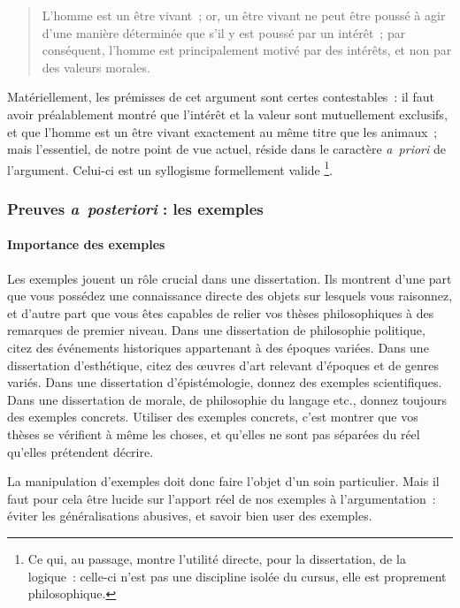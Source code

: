 \documentclass[a4paper]{article}
\begin{document}
\begin{quote}
L'homme est un être vivant ; or, un être vivant ne peut être poussé à
agir d'une manière déterminée que s'il y est poussé par un intérêt ;
par conséquent, l'homme est principalement motivé par des intérêts, et
non par des valeurs morales.
\end{quote}

Matériellement, les prémisses de cet argument sont certes contestables :
il faut avoir préalablement montré que l'intérêt et la valeur sont
mutuellement exclusifs, et que l'homme est un être vivant exactement au
même titre que les animaux ; mais l'essentiel, de notre point de vue
actuel, réside dans le caractère \emph{a priori} de l'argument. Celui-ci est
un syllogisme formellement valide \footnote{Ce qui, au passage, montre l'utilité directe, pour la dissertation,
de la logique : celle-ci n'est pas une discipline isolée du cursus,
elle est proprement philosophique.}.

\subsubsection{Preuves \emph{a posteriori} : les exemples}
\label{sec-3-3-2}

\paragraph{Importance des exemples}
\label{sec-3-3-2-1}

Les exemples jouent un rôle crucial dans une dissertation. Ils montrent
d'une part que vous possédez une connaissance directe des objets sur
lesquels vous raisonnez, et d'autre part que vous êtes capables de
relier vos thèses philosophiques à des remarques de premier niveau. Dans
une dissertation de philosophie politique, citez des événements
historiques appartenant à des époques variées. Dans une dissertation
d'esthétique, citez des œuvres d'art relevant d'époques et de genres
variés. Dans une dissertation d'épistémologie, donnez des exemples
scientifiques. Dans une dissertation de morale, de philosophie du
langage etc., donnez toujours des exemples concrets. Utiliser des
exemples concrets, c'est montrer que vos thèses se vérifient à même les
choses, et qu'elles ne sont pas séparées du réel qu'elles prétendent
décrire.

La manipulation d'exemples doit donc faire l'objet d'un soin
particulier. Mais il faut pour cela être lucide sur l'apport réel de nos
exemples à l'argumentation : éviter les généralisations abusives, et
savoir bien user des exemples.
\end{document}
